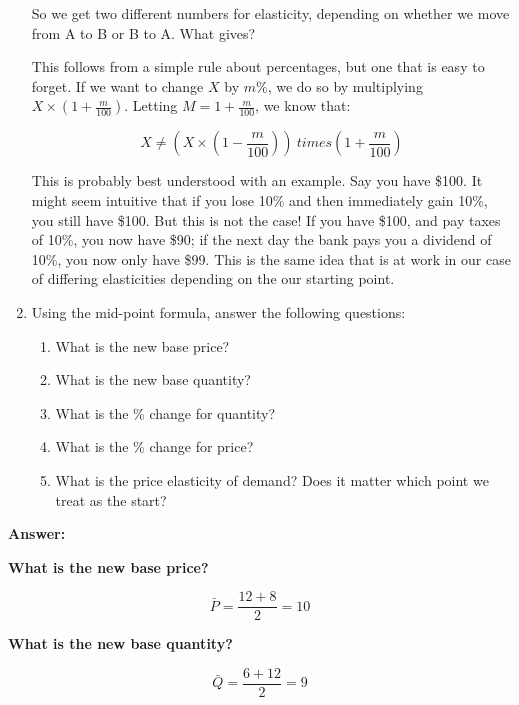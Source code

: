 \documentclass[12pt]{article}
\begin{document}
\begin{enumerate}
So we get two different numbers for elasticity, depending on whether we move from A to B or B to A. What gives?

\vspace{2mm}

This follows from a simple rule about percentages, but one that is easy to forget. If we want to change $X$ by $m\%$, we do so by multiplying $X \times (1 + \frac{m}{100})$. Letting $M = 1 + \frac{m}{100}$, we know that:

$$ X \neq (X \times (1 - \frac{m}{100})) \ times (1 + \frac{m}{100}) $$

This is probably best understood with an example. Say you have \$100. It might seem intuitive that if you lose 10\% and then immediately gain 10\%, you still have \$100. But this is not the case! If you have \$100, and pay taxes of 10\%, you now have \$90; if the next day the bank pays you a dividend of 10\%, you now only have \$99. This is the same idea that is at work in our case of differing elasticities depending on the our starting point.

\medskip


\item Using the mid-point formula, answer the following questions:
\begin{enumerate}
    \item What is the new base price?
    \item What is the new base quantity?
    \item What is the \% change for quantity?
    \item What is the \% change for price?
    \item What is the price elasticity of demand? Does it matter which point we treat as the start?
\end{enumerate}
\end{enumerate}

\vspace{2mm}

\textbf{Answer:}

\vspace{2mm}

\textbf{What is the new base price?}

\vspace{2mm}

$$\bar{P} = \dfrac{12 + 8}{2} = 10$$

\textbf{What is the new base quantity?}

$$\bar{Q} = \dfrac{6 + 12}{2} = 9$$
\end{document}
